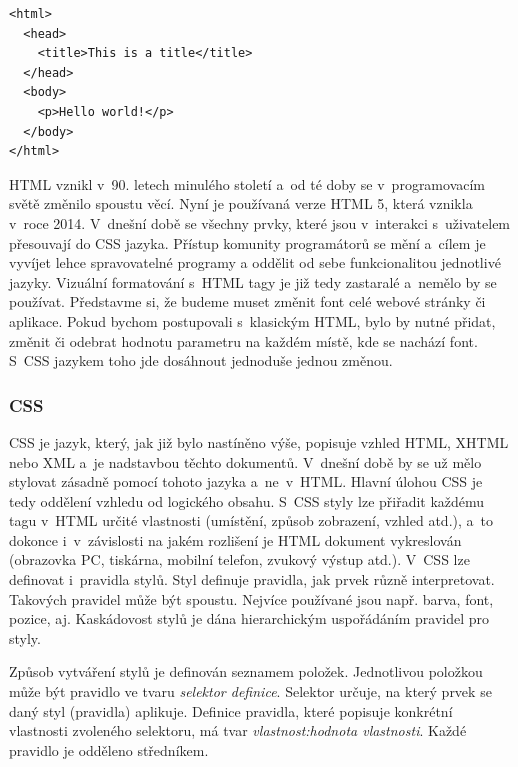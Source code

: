 \begin{lstlisting}[numbers=none, caption=Ukázka HTML dokumentu., label=lst:HTML]
<html>
  <head>
    <title>This is a title</title>
  </head>
  <body>
    <p>Hello world!</p>
  </body>
</html>
\end{lstlisting}



HTML vznikl v~90. letech minulého století a~od té doby se v~programovacím světě změnilo spoustu věcí. Nyní je používaná verze HTML 5, která vznikla v~roce 2014. V~dnešní době se všechny prvky, které jsou v~interakci s~uživatelem přesouvají do CSS jazyka. Přístup komunity programátorů se mění a~cílem je vyvíjet lehce spravovatelné programy a oddělit od sebe funkcionalitou jednotlivé jazyky. Vizuální formatování s~HTML tagy je již tedy zastaralé a~nemělo by se používat. Představme si, že budeme muset změnit font celé webové stránky či aplikace. Pokud bychom postupovali s~klasickým HTML, bylo by nutné přidat, změnit či odebrat hodnotu parametru na každém místě, kde se nachází font. S~CSS jazykem toho jde dosáhnout jednoduše jednou změnou.\cite{11}\cite{12}

\subsubsection{CSS}
\label{sec:CSS}
CSS je jazyk, který, jak již bylo nastíněno výše, popisuje vzhled HTML, XHTML nebo XML a~je nadstavbou těchto dokumentů. V~dnešní době by se už mělo stylovat zásadně pomocí tohoto jazyka a~ne~v~HTML. Hlavní úlohou CSS je tedy oddělení vzhledu od logického obsahu. S~CSS styly lze přiřadit každému tagu v~HTML určité vlastnosti (umístění, způsob zobrazení, vzhled atd.), a~to dokonce i~v~závislosti na jakém rozlišení je HTML dokument vykreslován (obrazovka PC, tiskárna, mobilní telefon, zvukový výstup atd.). V~CSS lze definovat i~pravidla stylů. Styl definuje pravidla, jak prvek různě interpretovat. Takových pravidel může být spoustu. Nejvíce používané jsou např. barva, font, pozice, aj. Kaskádovost stylů je dána hierarchickým uspořádáním pravidel pro styly.

Způsob vytváření stylů je definován seznamem položek. Jednotlivou položkou může být pravidlo ve tvaru \textit{selektor definice}. Selektor určuje, na který prvek se daný styl (pravidla) aplikuje. Definice pravidla, které popisuje konkrétní vlastnosti zvoleného selektoru, má tvar \textit{vlastnost:hodnota vlastnosti}. Každé pravidlo je odděleno středníkem.\cite{11}\cite{12} \\

